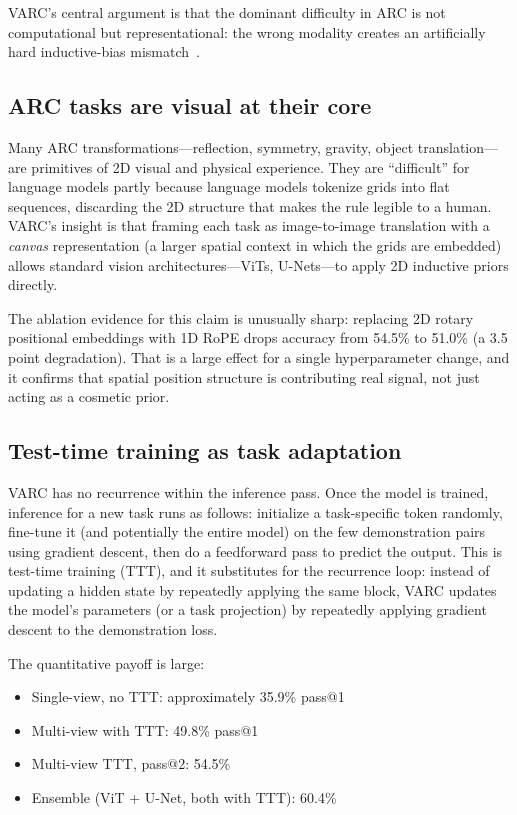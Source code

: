 \documentclass[11pt, letterpaper]{article}
\begin{document}
VARC's central argument is that the dominant difficulty in ARC is not
computational but representational: the wrong modality creates an
artificially hard inductive-bias mismatch~\cite{hu2025varc}.

\subsection{ARC tasks are visual at their core}

Many ARC transformations---reflection, symmetry, gravity, object
translation---are primitives of 2D visual and physical experience. They
are ``difficult'' for language models partly because language models
tokenize grids into flat sequences, discarding the 2D structure that
makes the rule legible to a human. VARC's insight is that framing each
task as image-to-image translation with a \emph{canvas} representation
(a larger spatial context in which the grids are embedded) allows standard
vision architectures---ViTs, U-Nets---to apply 2D inductive priors
directly.

The ablation evidence for this claim is unusually sharp: replacing 2D
rotary positional embeddings with 1D RoPE drops accuracy from 54.5\% to
51.0\% (a 3.5 point degradation). That is a large effect for a single
hyperparameter change, and it confirms that spatial position structure
is contributing real signal, not just acting as a cosmetic prior.

\subsection{Test-time training as task adaptation}

VARC has no recurrence within the inference pass. Once the model is trained,
inference for a new task runs as follows: initialize a task-specific token
randomly, fine-tune it (and potentially the entire model) on the few
demonstration pairs using gradient descent, then do a feedforward pass to
predict the output. This is test-time training (TTT), and it substitutes
for the recurrence loop: instead of updating a hidden state by repeatedly
applying the same block, VARC updates the model's parameters (or a task
projection) by repeatedly applying gradient descent to the demonstration
loss.

The quantitative payoff is large:
\begin{itemize}
  \item Single-view, no TTT: approximately 35.9\% pass@1
  \item Multi-view with TTT: 49.8\% pass@1
  \item Multi-view TTT, pass@2: 54.5\%
  \item Ensemble (ViT + U-Net, both with TTT): 60.4\%
\end{itemize}
\end{document}
